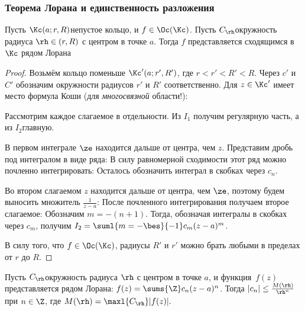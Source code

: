 \documentclass[a4paper]{article}
\begin{document}
\subsubsection{Теорема Лорана и единственность разложения}

\begin{theorem}[Лорана]
Пусть $\Kc(a;r,R)$\т непустое кольцо, и $f \in \Oc(\Kc)$. Пусть $C_\rh$\т окружность радиуса $\rh \in (r, R)$ с
центром в точке $a$. Тогда $f$ представляется сходящимся в $\Kc$ рядом Лорана
\end{theorem}
\begin{proof}
Возьмём кольцо поменьше $\Kc'(a;r',R')$, где $r < r' < R' < R$. Через $c'$ и $C'$ обозначим окружности
радиусов $r'$ и $R'$ соответственно. Для $z\in \Kc'$ имеет место формула Коши
(для \emph{многосвязной} области!):

Рассмотрим каждое слагаемое в отдельности. Из $I_1$ получим регулярную часть, а из $I_2$\т главную.

 В первом интеграле $\ze$ находится дальше от центра, чем $z$. Представим дробь под интегралом в виде ряда:
В силу равномерной сходимости этот ряд можно почленно интегрировать:
Осталось обозначить интеграл в скобках через $c_n$.

 Во втором слагаемом $z$ находится дальше от центра, чем $\ze$, поэтому будем выносить множитель $\frac{1}{z-a}$:
После почленного интегрирования получаем второе слагаемое:
Обозначим $m = -(n+1)$. Тогда, обозначая интегралы в скобках через $c_m$, получим $I_2 = \suml{m=-\bes}{-1} c_m (z-a)^m$.

В силу того, что $f \in \Oc(\Kc)$, радиусы $R'$ и $r'$ можно брать любыми в пределах от $r$ до $R$.
\end{proof}
\begin{imp}
Пусть $C_\rh$\т окружность радиуса $\rh$ с центром в точке $a$, и функция~$f(z)$ представляется рядом
Лорана: $f(z) = \sums{\Z}c_n(z-a)^n$. Тогда $|c_n| \le \frac{M(\rh)}{\rh^n}$ при $n \in \Z$,
где $M(\rh)=\maxl{C_\rh}|f(z)|.$
\end{imp}
\end{document}
